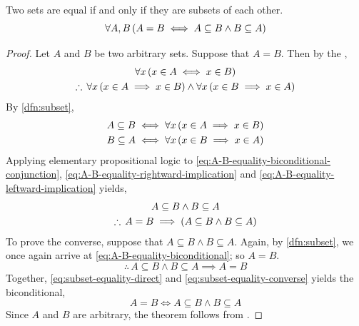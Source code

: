 \begin{thm}
    \label{thm:set-equality-in-terms-of-subsets}
    Two sets are equal if and only if they are subsets of each other.
    \begin{equation*}
        \forall A,B \, \mleft( A = B \iff A \subseteq B \land B \subseteq A \mright)
    \end{equation*}
\end{thm}

\begin{proof}
    Let \( A \) and \( B \) be two arbitrary sets. Suppose that \( A = B \).
    Then by the ,
    \begin{gather}
        \forall x \, \mleft( x \in A \iff x \in B \mright) \label{eq:A-B-equality-biconditional} \\
        \therefore \, \forall x \, \mleft( x \in A \implies x \in B \mright)
        \land
        \forall x \, \mleft( x \in B \implies x \in A \mright) \label{eq:A-B-equality-biconditional-conjunction}
    \end{gather}
    By \cref{dfn:subset},
    \begin{gather}
        A \subseteq B \iff \forall x \, \mleft( x \in A \implies x \in B \mright) \label{eq:A-B-equality-rightward-implication} \\
        B \subseteq A \iff \forall x \, \mleft( x \in B \implies x \in A \mright) \label{eq:A-B-equality-leftward-implication}
    \end{gather}
    Applying elementary propositional logic to \eqref{eq:A-B-equality-biconditional-conjunction},
    \eqref{eq:A-B-equality-rightward-implication} and \eqref{eq:A-B-equality-leftward-implication} yields,
    \begin{gather}
        A \subseteq B \land B \subseteq A \notag \\
        \therefore \, A = B \implies \mleft( A \subseteq B \land B \subseteq A \mright) \label{eq:subset-equality-direct}
    \end{gather}
    To prove the converse, suppose that \( A \subseteq B \land B \subseteq A \). Again,
    by \cref{dfn:subset}, we once again arrive at \eqref{eq:A-B-equality-biconditional}; so \( A = B \).
    \begin{equation}
        \label{eq:subset-equality-converse}
        \therefore \, A \subseteq B \land B \subseteq A \implies A = B
    \end{equation}
    Together, \eqref{eq:subset-equality-direct} and \eqref{eq:subset-equality-converse} yields the biconditional,
    \begin{equation*}
        A = B \iff A \subseteq B \land B \subseteq A
    \end{equation*}
    Since \( A \) and \( B \) are arbitrary, the theorem follows from .
\end{proof}

